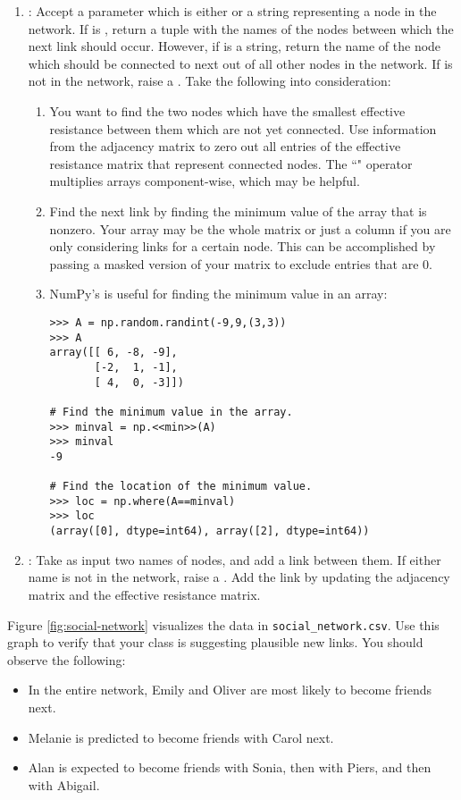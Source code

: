 \begin{enumerate}
\item {}: Accept a parameter  which is either  or a string representing a node in the network. If  is , return a tuple with the names of the nodes between which the next link should occur. However, if  is a string, return the name of the node which should be connected to  next out of all other nodes in the network. If  is not in the network, raise a . Take the following into consideration:

\begin{enumerate}
\item You want to find the two nodes which have the smallest effective resistance between them which are not yet connected.
Use information from the adjacency matrix to zero out all entries of the effective resistance matrix that represent connected nodes. The ``\li{*}" operator multiplies arrays component-wise, which may be helpful.

\item Find the next link by finding the minimum value of the array that is nonzero.
Your array may be the whole matrix or just a column if you are only considering links for a certain node.
This can be accomplished by passing  a masked version of your matrix to exclude entries that are $0$.

\item NumPy's  is useful for finding the minimum value in an array:

\begin{lstlisting}
>>> A = np.random.randint(-9,9,(3,3))
>>> A
array([[ 6, -8, -9],
       [-2,  1, -1],
       [ 4,  0, -3]])

# Find the minimum value in the array.
>>> minval = np.<<min>>(A)
>>> minval
-9

# Find the location of the minimum value.
>>> loc = np.where(A==minval)
>>> loc
(array([0], dtype=int64), array([2], dtype=int64))
\end{lstlisting}
\end{enumerate}


\item {}: Take as input two names of nodes, and add a link between them. If either name is not in the network, raise a . Add the link by updating the adjacency matrix and the effective resistance matrix.
\end{enumerate}

Figure \ref{fig:social-network} visualizes the data in \texttt{social\_network.csv}.
Use this graph to verify that your class is suggesting plausible new links.
You should observe the following:
\begin{itemize}
\item In the entire network, Emily and Oliver are most likely to become friends next.
\item Melanie is predicted to become friends with Carol next.
\item Alan is expected to become friends with Sonia, then with Piers, and then with Abigail.
\end{itemize}
